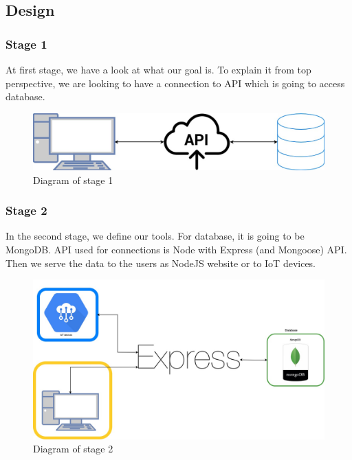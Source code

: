 \subsection{Design}

\subsubsection{Stage 1}
At first stage, we have a look at what our goal is. To explain it from top perspective, we are looking to have a connection to API which is going to access database.
\newline
\begin{figure}[H]
\includegraphics[scale=0.3]{img/systemDiagram-simplev.jpg}
\centering
\caption{Diagram of stage 1}
\end{figure}

\subsubsection{Stage 2}
In the second stage, we define our tools. For database, it is going to be MongoDB. API used for connections is Node with Express (and Mongoose) API. Then we serve the data to the users as NodeJS website or to IoT devices.
\newline
\begin{figure}[H]
\includegraphics[scale=0.3]{img/systemDiagram-simplev2.jpg}
\centering
\caption{Diagram of stage 2}
\end{figure}

